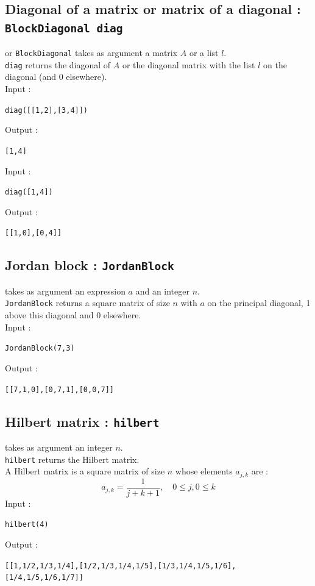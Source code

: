 \documentclass[a4paper,11pt]{book}
\begin{document}
\subsection{Diagonal of a matrix or matrix of a diagonal : {\tt BlockDiagonal diag}}
 or {\tt BlockDiagonal} takes as argument a matrix $A$ or
a list $l$.\\
{\tt diag} returns the diagonal of $A$ or the diagonal matrix with the list
$l$ on the diagonal (and 0 elsewhere).\\
Input :
\begin{center}{\tt diag([[1,2],[3,4]])}\end{center}
Output :
\begin{center}{\tt  [1,4]}\end{center}
Input :
\begin{center}{\tt diag([1,4])}\end{center}
Output :
\begin{center}{\tt  [[1,0],[0,4]]}\end{center}

\subsection{Jordan block : {\tt JordanBlock}}
 takes as argument an expression $a$ and an integer 
$n$.\\
{\tt JordanBlock} returns a square matrix of size $n$ with $a$
on the  principal diagonal, 1 above this diagonal and 0 elsewhere.\\
Input :
\begin{center}{\tt JordanBlock(7,3)}\end{center}
Output :
\begin{center}{\tt [[7,1,0],[0,7,1],[0,0,7]]}\end{center}

\subsection{Hilbert matrix : {\tt hilbert}}
 takes as  argument an integer $n$.\\
{\tt hilbert} returns the Hilbert matrix.\\
 A Hilbert matrix is a square matrix of size $n$ whose elements 
$a_{j,k}$ are :
\[ a_{j,k}=\frac{1}{j+k+1}, \quad 0\leq j, 0 \leq k \]
Input :
\begin{center}{\tt hilbert(4)}\end{center}
Output :
\begin{center}{\tt [[1,1/2,1/3,1/4],[1/2,1/3,1/4,1/5],[1/3,1/4,1/5,1/6], [1/4,1/5,1/6,1/7]]}\end{center}
\end{document}
